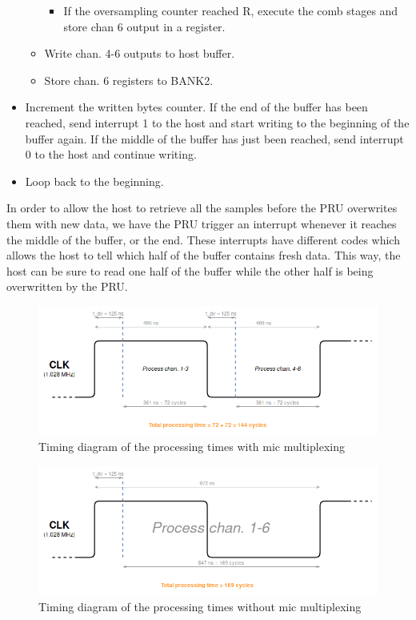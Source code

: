 \documentclass[]{report}
\providecommand{\tightlist}{%
	\setlength{\itemsep}{0pt}\setlength{\parskip}{0pt}}
\begin{document}
\begin{itemize}
\begin{itemize}
    \begin{itemize}
    \tightlist
    \item
      If the oversampling counter reached R, execute the comb stages and
      store chan 6 output in a register.
    \end{itemize}
  \item
    Write chan. 4-6 outputs to host buffer.
  \item
    Store chan. 6 registers to BANK2.
  \end{itemize}
\item
  Increment the written bytes counter. If the end of the buffer has been
  reached, send interrupt 1 to the host and start writing to the
  beginning of the buffer again. If the middle of the buffer has just
  been reached, send interrupt 0 to the host and continue writing.
\item
  Loop back to the beginning.
\end{itemize}

In order to allow the host to retrieve all the samples before the PRU
overwrites them with new data, we have the PRU trigger an interrupt
whenever it reaches the middle of the buffer, or the end. These
interrupts have different codes which allows the host to tell which half
of the buffer contains fresh data. This way, the host can be sure to
read one half of the buffer while the other half is being overwritten by
the PRU.

\begin{figure}[h]
\centering
\includegraphics[width=1.0\linewidth]{Pictures/PRU_timing_diagram_mic_multiplexing.png}
\caption{Timing diagram of the processing times with mic multiplexing}
\end{figure}

\begin{figure}[h]
\centering
\includegraphics[width=1.0\linewidth]{Pictures/PRU_timing_diagram_no_mic_multiplexing.png}
\caption{Timing diagram of the processing times without mic
multiplexing}
\end{figure}
\end{document}

